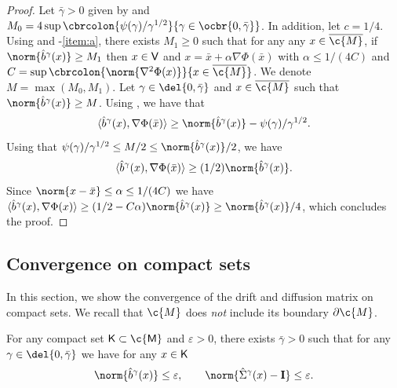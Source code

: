 \begin{proof}
	Let $\bar{\gamma} >0$ given by  and $M_0 = 4 \sup \cbrcolon{\psi(\gamma)/\gamma^{1/2}}{\gamma \in \ocbr{0, \bar{\gamma}}}$.
	In addition, let $c = 1/4$.
	Using  and -\ref{item:a}, there exists $M_1 \geq 0$ such that for any any $x \in \cl{\c{M}}$, if $\norm{\hat{b}^\gamma(x)} \geq M_1$ then $x \in \sf{V}$ and $x = \bar{x} + \alpha \nabla \Phi(\bar{x})$ with $\alpha \leq 1/(4C)$ and $C = \sup \cbrcolon{\norm{\nabla^2 \Phi(x)}}{x \in \cl{\c{M}}}$.
	We denote $M = \max(M_0, M_1)$.
	Let $\gamma \in \del{0, \bar{\gamma}}$ and $x \in \cl{\c{M}}$ such that $\norm{\hat{b}^\gamma(x)} \geq M$.
	Using , we have that \begin{equation} \langle \hat{b}^\gamma(x), \nabla \Phi(\bar{x}) \rangle \geq \norm{\hat{b}^\gamma(x)} - \psi(\gamma)/\gamma^{1/2} .
	\end{equation}
	Using that $\psi(\gamma)/\gamma^{1/2} \leq M/2 \leq \norm{\hat{b}^\gamma(x)}/2$, we have \begin{equation} \langle \hat{b}^\gamma(x), \nabla \Phi(\bar{x}) \rangle \geq (1/2) \norm{\hat{b}^\gamma(x)} .
	\end{equation}
	Since $\norm{x - \bar{x}} \leq \alpha \leq 1/(4C)$ we have $\langle \hat{b}^\gamma(x), \nabla \Phi(x) \rangle \geq (1/2 - C \alpha ) \norm{\hat{b}^\gamma(x)} \geq \norm{\hat{b}^\gamma(x)} / 4$, which concludes the proof.
\end{proof}

\subsection{Convergence on compact sets}
\label{sec:convergence_on_compact}

In this section, we show the convergence of the drift and diffusion matrix on compact sets.
We recall that $\c{M}$ does \emph{not} include its boundary $\partial \c{M}$.

\begin{proposition}
	\label{prop:condition_uno}
	For any compact set $\sf{K} \subset \c{M}$ and $\varepsilon >0$, there exists $\bar{\gamma} >0$ such that for any $\gamma \in \del{0, \bar{\gamma}}$ we have for any $x \in \sf{K}$ \begin{equation} \norm{\hat{b}^\gamma(x)} \leq \varepsilon , \qquad \norm{\hat{\Sigma}^\gamma(x) - \m{I}} \leq \varepsilon .
	\end{equation}
\end{proposition}

